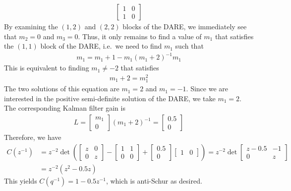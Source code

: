 \begin{enumerate}
\begin{align*}
\begin{bmatrix}
                1 & 0 \\
                1 & 0
            \end{bmatrix}
    \end{align*}
    By examining the $(1,2)$ and $(2,2)$ blocks of the DARE, we immediately see that $m_2 = 0$ and $m_3 = 0$. Thus, it only remains to find a value of $m_1$ that satisfies the $(1,1)$ block of the DARE, i.e.\ we need to find $m_1$ such that
    \begin{align*}
        m_1 = m_1 + 1 - m_1 (m_1 + 2)^{-1} m_1
    \end{align*}
    This is equivalent to finding $m_1 \neq -2$ that satisfies 
    \begin{align*}
        m_1 + 2 = m_1^2
    \end{align*}
    The two solutions of this equation are $m_1 = 2$ and $m_1 = -1$. Since we are interested in the positive semi-definite solution of the DARE, we take $m_1 = 2$. The corresponding Kalman filter gain is
    \begin{align*}
        L = \begin{bmatrix}
                m_1 \\
                0
            \end{bmatrix} (m_1 + 2)^{-1} = \begin{bmatrix}
                0.5 \\
                0
            \end{bmatrix}
    \end{align*}
    Therefore, we have
    \begin{align*}
        C(z^{-1}) & = z^{-2} \det \left( \begin{bmatrix}
                z & 0 \\
                0 & z
            \end{bmatrix} - \begin{bmatrix}
                1 & 1 \\
                0 & 0
            \end{bmatrix} + \begin{bmatrix}
                0.5 \\
                0
            \end{bmatrix} \begin{bmatrix}
                1 & 0
            \end{bmatrix} \right) = z^{-2} \det \begin{bmatrix}
                z - 0.5 & -1 \\
                0 & z
            \end{bmatrix} \\
        & = z^{-2} (z^2-0.5z)
    \end{align*}
    This yields $C(q^{-1}) = 1 - 0.5 z^{-1}$, which is anti-Schur as desired.


\end{enumerate}
